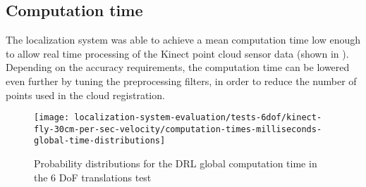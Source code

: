 %
%



\subsection{Computation time}

The localization system was able to achieve a mean computation time low enough to allow real time processing of the Kinect point cloud sensor data (shown in ). Depending on the accuracy requirements, the computation time can be lowered even further by tuning the preprocessing filters, in order to reduce the number of points used in the cloud registration.

\begin{figure}[H]
	\centering
	\texttt{[image: localization-system-evaluation/tests-6dof/kinect-fly-30cm-per-sec-velocity/computation-times-milliseconds-global-time-distributions]}
	\caption{Probability distributions for the DRL global computation time in the 6 DoF translations test}
	\label{fig:localization-system-evaluation_kinect-fly-30cm-per-sec-velocity-computation-time}
\end{figure}

